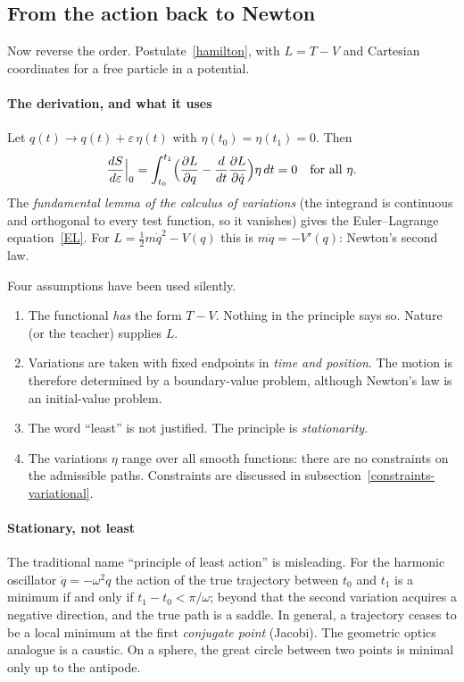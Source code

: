 \subsection{From the action back to Newton}
\label{action-to-newton}

Now reverse the order. Postulate~\eqref{hamilton}, with $L=T-V$ and
Cartesian coordinates for a free particle in a potential.

\paragraph{The derivation, and what it uses}

Let $q(t)\to q(t)+\varepsilon\,\eta(t)$ with $\eta(t_0)=\eta(t_1)=0$. Then
\[
  \frac{dS}{d\varepsilon}\Big|_0=\int_{t_0}^{t_1}
  \Bigl(\frac{\partial L}{\partial q}-\frac{d}{dt}\frac{\partial L}{\partial\dot q}\Bigr)\eta\,dt=0
  \quad\text{for all }\eta .
\]
The \emph{fundamental lemma of the calculus of variations} (the integrand is
continuous and orthogonal to every test function, so it vanishes) gives the
Euler--Lagrange equation~\eqref{EL}. For $L=\tfrac12m\dot q^2-V(q)$ this is
$m\ddot q=-V'(q)$: Newton's second law.

Four assumptions have been used silently.
\begin{enumerate}
  \item The functional \emph{has} the form $T-V$. Nothing in the principle
  says so. Nature (or the teacher) supplies $L$.
  \item Variations are taken with fixed endpoints in \emph{time and
  position}. The motion is therefore determined by a boundary-value problem,
  although Newton's law is an initial-value problem.
  \item The word ``least'' is not justified. The principle is
  \emph{stationarity}.
  \item The variations $\eta$ range over all smooth functions: there are no
  constraints on the admissible paths. Constraints are discussed in
  subsection~\ref{constraints-variational}.
\end{enumerate}

\paragraph{Stationary, not least}
\label{least}

The traditional name ``principle of least action'' is misleading. For the
harmonic oscillator $\ddot q=-\omega^2q$ the action of the true trajectory
between $t_0$ and $t_1$ is a minimum if and only if $t_1-t_0<\pi/\omega$;
beyond that the second variation acquires a negative direction, and the
true path is a saddle. In general, a trajectory ceases to be a local minimum
at the first \emph{conjugate point} (Jacobi). The geometric optics analogue is
a caustic. On a sphere, the great circle between two points is minimal only
up to the antipode.

